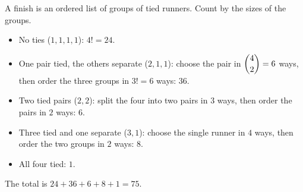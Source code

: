 A finish is an ordered list of groups of tied runners. Count by the sizes of the groups.
\begin{itemize}
\item No ties ($1,1,1,1$): $4!=24$.
\item One pair tied, the others separate ($2,1,1$): choose the pair in $\dbinom42=6$ ways, then order the three groups in $3!=6$ ways: $36$.
\item Two tied pairs ($2,2$): split the four into two pairs in $3$ ways, then order the pairs in $2$ ways: $6$.
\item Three tied and one separate ($3,1$): choose the single runner in $4$ ways, then order the two groups in $2$ ways: $8$.
\item All four tied: $1$.
\end{itemize}
The total is $24+36+6+8+1=\boxed{75}$.
